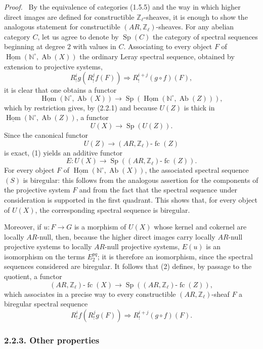 \documentclass[11pt]{article}
\providecommand{\uHom}{\underline{\Hom}}
\newenvironment{prooftext}[1][Proof]{\par\noindent\emph{#1.}\ }{\par\medskip}
\DeclareMathOperator{\Hom}{Hom}
\providecommand{\Hom}{\operatorname{Hom}}
\providecommand{\Sp}{\operatorname{Sp}}
\providecommand{\Ab}{\operatorname{Ab}}
\providecommand{\fc}{\operatorname{fc}}
\providecommand{\Ab}{\operatorname{Ab}}
\providecommand{\Hom}{\operatorname{Hom}}
\begin{document}
\begin{prooftext}[Proof]
By the equivalence of categories (1.5.5) and the way in which higher direct images are defined for constructible \(\mathbb Z_\ell\)-sheaves, it is enough to show the analogous statement for constructible \((AR,\mathbb Z_\ell)\)-sheaves. For any abelian category \(C\), let us agree to denote by \(\Sp(C)\) the category of spectral sequences beginning at degree \(2\) with values in \(C\). Associating to every object \(F\) of \(\uHom(\mathbb N^\circ,\Ab(X))\) the ordinary Leray spectral sequence, obtained by extension to projective systems,
\[
R^i_! g(R^j_! f(F))\Longrightarrow R^{i+j}_!(g\circ f)(F),
\tag{S}
\]
it is clear that one obtains a functor
\[
\uHom(\mathbb N^\circ,\Ab(X))\longrightarrow \Sp(\uHom(\mathbb N^\circ,\Ab(Z))),
\]
which by restriction gives, by (2.2.1) and because \(U(Z)\) is thick in \(\uHom(\mathbb N^\circ,\Ab(Z))\), a functor
\[
U(X)\longrightarrow \Sp(U(Z)).
\tag{1}
\]
Since the canonical functor
\[
U(Z)\longrightarrow (AR,\mathbb Z_\ell)\text{-}\fc(Z)
\]
is exact, (1) yields an additive functor
\[
E:U(X)\longrightarrow \Sp((AR,\mathbb Z_\ell)\text{-}\fc(Z)).
\tag{2}
\]
For every object \(F\) of \(\uHom(\mathbb N^\circ,\Ab(X))\), the associated spectral sequence \((S)\) is biregular: this follows from the analogous assertion for the components of the projective system \(F\) and from the fact that the spectral sequence under consideration is supported in the first quadrant. This shows that, for every object of \(U(X)\), the corresponding spectral sequence is biregular.

Moreover, if \(u:F\to G\) is a morphism of \(U(X)\) whose kernel and cokernel are locally \(AR\)-null, then, because the higher direct images carry locally \(AR\)-null projective systems to locally \(AR\)-null projective systems, \(E(u)\) is an isomorphism on the terms \(E_2^{pq}\); it is therefore an isomorphism, since the spectral sequences considered are biregular. It follows that (2) defines, by passage to the quotient, a functor
\[
(AR,\mathbb Z_\ell)\text{-}\fc(X)
\longrightarrow \Sp((AR,\mathbb Z_\ell)\text{-}\fc(Z)),
\tag{3}
\]
which associates in a precise way to every constructible \((AR,\mathbb Z_\ell)\)-sheaf \(F\) a biregular spectral sequence
\[
R^i_!f(R^j_!g(F))\Longrightarrow R^{i+j}_!(g\circ f)(F).
\]
\end{prooftext}

\subsubsection*{2.2.3. Other properties}
\end{document}

